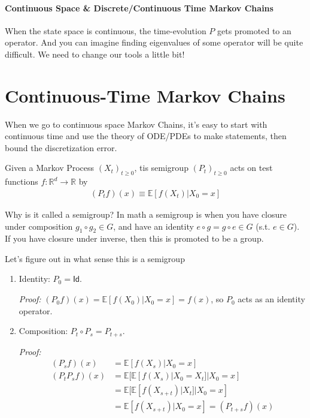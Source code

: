 \paragraph{Continuous Space \&  Discrete/Continuous Time Markov Chains}
When the state space is continuous, the time-evolution $P$ gets promoted to an operator. And you can imagine finding eigenvalues of some operator will be quite difficult. We need to change our tools a little bit!





\section{Continuous-Time Markov Chains}
When we go to continuous space Markov Chains, it's easy to start with continuous time and use the theory of ODE/PDEs to make statements, then bound the discretization error.
\begin{definition}
	 Given a Markov Process $(X_t)_{t\geq 0}$, tis semigroup $(P_t)_{t\geq0}$ acts on test functions $f : \mathbb R^d \to \mathbb R$ by
	\begin{align}
		(P_t f) (x) \equiv \mathbb E[f (X_t) | X_0 = x]
	\end{align}
\end{definition}
Why is it called a semigroup? In math a semigroup is when you have closure under composition $g_1 \circ g_2 \in G$, and have an identity $e \circ g = g \circ e \in G$ (s.t. $e \in G$). If you have closure under inverse, then this is promoted to be a group. 
\begin{property}
	Let's figure out in what sense this is a semigroup
	\begin{enumerate}
	\item Identity: $P_0 = \textsf{Id}$.
	
	\emph{Proof:} $(P_0 f) (x) = \mathbb E[f(X_0) | X_0 = x] = f(x)$, so $P_0$ acts as an identity operator.
	
	\item Composition: $P_t \circ P_s = P_{t+s}$.
	
	\emph{Proof:} 
	\begin{align}
		(P_s f)(x) & = \mathbb E[f(X_s) | X_0 = x]\\
		(P_t P_s f)(x) & = \mathbb E[\mathbb E[f(X_s) | X_0 = X_t] | X_0 = x]\\
		& = \mathbb E[\mathbb E[f(X_{s+t}) |X_t] | X_0 =x]\\
		& = \mathbb E[f(X_{s+t}) | X_0 = x] = (P_{t+s} f)(x)
	\end{align}
\end{enumerate}
\end{property}




